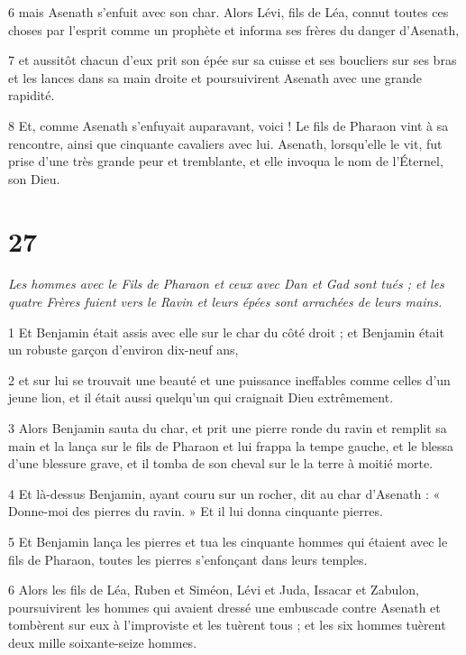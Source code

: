 \par 6 mais Asenath s'enfuit avec son char. Alors Lévi, fils de Léa, connut toutes ces choses par l'esprit comme un prophète et informa ses frères du danger d'Asenath,

\par 7 et aussitôt chacun d'eux prit son épée sur sa cuisse et ses boucliers sur ses bras et les lances dans sa main droite et poursuivirent Asenath avec une grande rapidité.

\par 8 Et, comme Asenath s'enfuyait auparavant, voici ! Le fils de Pharaon vint à sa rencontre, ainsi que cinquante cavaliers avec lui. Asenath, lorsqu'elle le vit, fut prise d'une très grande peur et tremblante, et elle invoqua le nom de l'Éternel, son Dieu.

\chapter{27}

\par \textit{Les hommes avec le Fils de Pharaon et ceux avec Dan et Gad sont tués ; et les quatre Frères fuient vers le Ravin et leurs épées sont arrachées de leurs mains.}


\par 1 Et Benjamin était assis avec elle sur le char du côté droit ; et Benjamin était un robuste garçon d'environ dix-neuf ans,

\par 2 et sur lui se trouvait une beauté et une puissance ineffables comme celles d'un jeune lion, et il était aussi quelqu'un qui craignait Dieu extrêmement.

\par 3 Alors Benjamin sauta du char, et prit une pierre ronde du ravin et remplit sa main et la lança sur le fils de Pharaon et lui frappa la tempe gauche, et le blessa d'une blessure grave, et il tomba de son cheval sur le la terre à moitié morte.

\par 4 Et là-dessus Benjamin, ayant couru sur un rocher, dit au char d'Asenath : « Donne-moi des pierres du ravin. » Et il lui donna cinquante pierres.

\par 5 Et Benjamin lança les pierres et tua les cinquante hommes qui étaient avec le fils de Pharaon, toutes les pierres s'enfonçant dans leurs temples.

\par 6 Alors les fils de Léa, Ruben et Siméon, Lévi et Juda, Issacar et Zabulon, poursuivirent les hommes qui avaient dressé une embuscade contre Asenath et tombèrent sur eux à l'improviste et les tuèrent tous ; et les six hommes tuèrent deux mille soixante-seize hommes.

